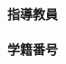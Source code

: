 \begin{titlepage}
  \begin{center}
    \vspace*{2zh}
    {\LARGE\bf \thesisyear\thesistype}\\
    \vspace*{6zh}
    {\LARGE\bf \thesistitle}\\
    \vspace*{8zh}
    {\Large\bf 指導教員}\\
    \vspace*{1zh}
    {\Large \thesisadvisor}\\
    \vspace*{4zh}
    {\Large\bf 学籍番号}\\
    \vspace*{1zh}
    {\Large \thesisstudentid}\\
    \vspace*{3zh}
    {\Large\bf \thesisauthor}\\
    \vspace*{6zh}
    {\large \thesisaffiliation}\\
  \end{center}
\end{titlepage}
